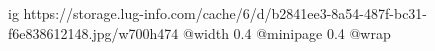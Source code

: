  
 
 
 
 

\ifcmt
  ig https://storage.lug-info.com/cache/6/d/b2841ee3-8a54-487f-bc31-f6e838612148.jpg/w700h474%
  @width 0.4
  @minipage 0.4
  @wrap \parpic[r]
\fi
